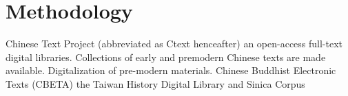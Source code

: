 
    \chapter{Methodology}%
    Chinese Text Project (abbreviated as Ctext henceafter) 
    an open-access full-text digital libraries. Collections of early and pre\-modern Chinese texts are made available. Digitalization of pre-modern materials. \cite{hu2019diachronic}
    Chinese Buddhist Electronic Texts (CBETA)
    the Taiwan History Digital Library
    and Sinica Corpus 
